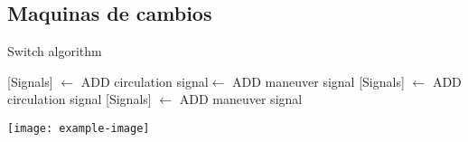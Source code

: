 \subsection{Maquinas de cambios}

    \lipsum[1-2]

    \begin{algorithm}[hbt!]
        \caption{Switch algorithm}\label{alg:SW}
        \DontPrintSemicolon
        \SetNoFillComment
        \LinesNotNumbered 
        {
            {
                {
                    [Signals] $\gets$ ADD circulation signal\;
                    [Signals] $\gets$ ADD maneuver signal\;
                }
                {
                    [Signals] $\gets$ ADD circulation signal\;
                }
                {
                    [Signals] $\gets$ ADD maneuver signal\;
                }
            }   
        }
        \KwResult{[Signals]} 
    \end{algorithm}

    \lipsum[1]
    \texttt{[image: example-image]}\\
    \lipsum[1-2]